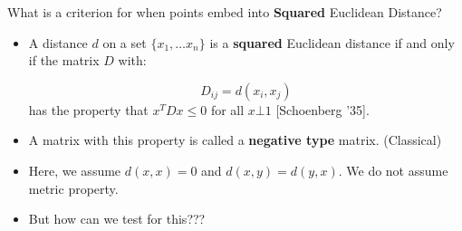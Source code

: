 % 
% 

\begin{frame}{What is a criterion for when points embed into
  \textbf{Squared}
  Euclidean Distance?} 
  \begin{itemize}[<+->]
  \item  A distance $d$ on a set $\{x_1, \ldots x_n\}$ is a \textbf{squared} Euclidean distance if and only
  if the matrix $D$ with:

 \[ D_{ij} = d(x_i, x_j) \]
 \pause
 has the property that $x^T D x \leq 0$ for all $x \bot 1$ [Schoenberg
 '35].
 \pause
 \item A matrix with this property is called a \textbf{negative type}
 matrix. (Classical)
  \item Here, we assume $d(x,x) = 0$ and $d(x,y) = d(y,x)$. We do not
  assume metric property.
  \item But how can we test for this???
  \end{itemize}
\end{frame}



